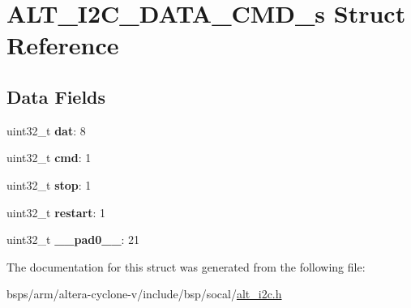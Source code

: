 \hypertarget{structALT__I2C__DATA__CMD__s}{}\section{A\+L\+T\+\_\+\+I2\+C\+\_\+\+D\+A\+T\+A\+\_\+\+C\+M\+D\+\_\+s Struct Reference}
\label{structALT__I2C__DATA__CMD__s}
\subsection*{Data Fields}
\begin{DoxyCompactItemize}
\item 
\mbox{\label{structALT__I2C__DATA__CMD__s_a9511a6a9ffbaee7ecd470d890859d6b4}} 
uint32\+\_\+t {\bfseries dat}\+: 8
\item 
\mbox{\label{structALT__I2C__DATA__CMD__s_a1eddd2c95d7374f84f9fffb8fcb2143c}} 
uint32\+\_\+t {\bfseries cmd}\+: 1
\item 
\mbox{\label{structALT__I2C__DATA__CMD__s_acf42b48f75a20c2a7d9e5ca2a7f7f6f2}} 
uint32\+\_\+t {\bfseries stop}\+: 1
\item 
\mbox{\label{structALT__I2C__DATA__CMD__s_adf91e3cba7e537ec674475f87ed815e6}} 
uint32\+\_\+t {\bfseries restart}\+: 1
\item 
\mbox{\label{structALT__I2C__DATA__CMD__s_aa35d2527345988b9db20dfab087d5afc}} 
uint32\+\_\+t {\bfseries \+\_\+\+\_\+pad0\+\_\+\+\_\+}\+: 21
\end{DoxyCompactItemize}


The documentation for this struct was generated from the following file\+:\begin{DoxyCompactItemize}
\item 
bsps/arm/altera-\/cyclone-\/v/include/bsp/socal/\mbox{\hyperlink{socal_2alt__i2c_8h}{alt\+\_\+i2c.\+h}}\end{DoxyCompactItemize}
